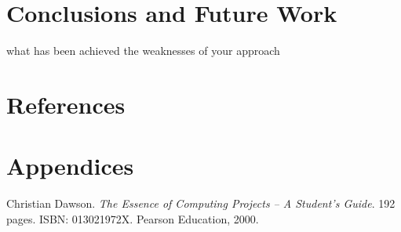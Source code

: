 \documentclass[]{final_report}
\begin{document}
\chapter{ Conclusions and Future Work}

what has been achieved
the weaknesses of your approach

\chapter{References}



\chapter{Appendices}


\newpage
\begin{thebibliography}{99}
 Christian Dawson. \emph{The Essence of Computing Projects -- A Student's Guide}. 192 pages. ISBN: 013021972X. Pearson Education, 2000.
\end{thebibliography}
\label{endpage}
\end{document}
